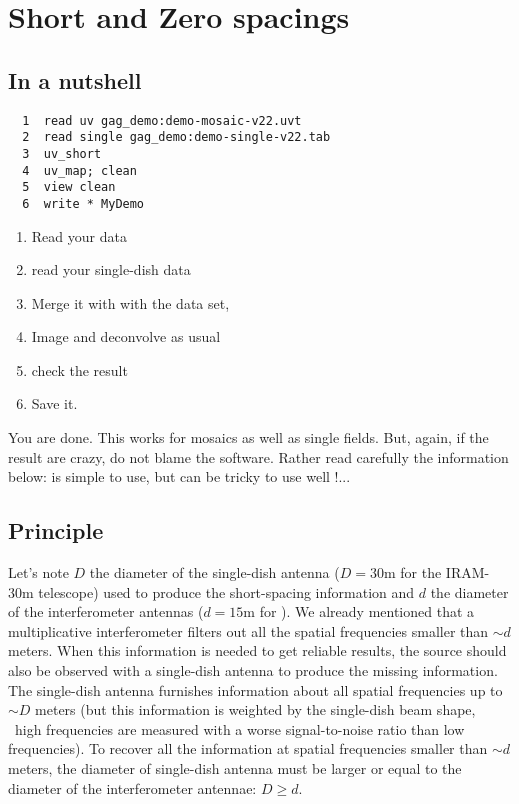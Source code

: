 \section{Short and Zero spacings} 
\label{sec:short-spacings}

\subsection{In a nutshell}

\begin{verbatim}
  1  read uv gag_demo:demo-mosaic-v22.uvt
  2  read single gag_demo:demo-single-v22.tab
  3  uv_short
  4  uv_map; clean
  5  view clean
  6  write * MyDemo
\end{verbatim}
\begin{enumerate}\itemsep 0pt
\item Read your \uv{} data
\item read your single-dish data
\item Merge it with with the \uv{} data set,
\item Image and deconvolve as usual
\item check the result
\item Save it. 
\end{enumerate}
You are done. This works for mosaics as well as single fields.
But, again, if the result are crazy, do not blame the software. 
Rather read carefully the information below: 
 is simple to use, but can be tricky to use well !...

\subsection{Principle}
Let's note $D$ the diameter of the single-dish antenna ($D = 30$m for the
IRAM-30m telescope) used to produce the short-spacing information and $d$
the diameter of the interferometer antennas ($d = 15$m for \PdBI{}). We
already mentioned that a multiplicative interferometer filters out all the
spatial frequencies smaller than $\sim d$ meters. When this information is
needed to get reliable results, the source should also be observed with a
single-dish antenna to produce the missing information.  The single-dish
antenna furnishes information about all spatial frequencies up to $\sim D$
meters (but this information is weighted by the single-dish beam shape,
\ie\ high frequencies are measured with a worse signal-to-noise ratio than
low frequencies). To recover all the information at spatial frequencies
smaller than $\sim d$ meters, the diameter of single-dish antenna must be
larger or equal to the diameter of the interferometer antennae: $D \ge d$.

